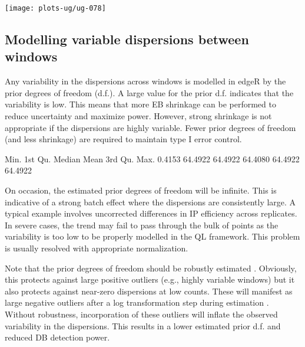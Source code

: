 \documentclass[12pt]{report}
\renewenvironment{Schunk}{\vspace{0pt}}{\vspace{0pt}}
\newcommand{\edger}{edgeR}
\begin{document}
\begin{center}
\texttt{[image: plots-ug/ug-078]}
\end{center}

\subsection{Modelling variable dispersions between windows}
Any variability in the dispersions across windows is modelled in \edger{} by the prior degrees of freedom (d.f.).
A large value for the prior d.f. indicates that the variability is low. 
This means that more EB shrinkage can be performed to reduce uncertainty and maximize power. 
However, strong shrinkage is not appropriate if the dispersions are highly variable. 
Fewer prior degrees of freedom (and less shrinkage) are required to maintain type I error control. 

\begin{Schunk}
\begin{Soutput}
   Min. 1st Qu.  Median    Mean 3rd Qu.    Max. 
 0.4153 64.4922 64.4922 64.4080 64.4922 64.4922 
\end{Soutput}
\end{Schunk}

On occasion, the estimated prior degrees of freedom will be infinite. 
This is indicative of a strong batch effect where the dispersions are consistently large.
A typical example involves uncorrected differences in IP efficiency across replicates. 
In severe cases, the trend may fail to pass through the bulk of points as the variability is too low to be properly modelled in the QL framework.
This problem is usually resolved with appropriate normalization.

Note that the prior degrees of freedom should be robustly estimated \citep{phipson2016}. 
Obviously, this protects against large positive outliers (e.g., highly variable windows) but it also protects against near-zero dispersions at low counts. 
These will manifest as large negative outliers after a log transformation step during estimation \citep{smyth2004}. 
Without robustness, incorporation of these outliers will inflate the observed variability in the dispersions.
This results in a lower estimated prior d.f. and reduced DB detection power.

\end{document}
